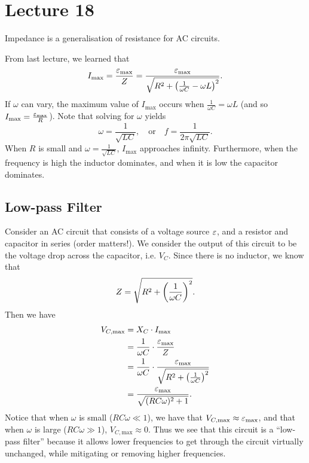 \documentclass[class=article, crop=false]{standalone}
\begin{document}
  \section{Lecture 18}
  \begin{note}{}
    Impedance is a generalisation of resistance for AC circuits.
  \end{note}
  From last lecture, we learned that
  \[
    I_\text{max} = \frac{\varepsilon_\text{max}}{Z} = \frac{\varepsilon_\text{max}}{\sqrt{R^2 + \left( \frac{1}{\omega C} - \omega L \right)^2}}.
  \]
  If $\omega$ can vary, the maximum value of $I_\text{max}$ occurs when $\frac{1}{\omega C} = \omega L$ (and so $I_\text{max} = \frac{\varepsilon_\text{max}}{R}$). Note that solving for $\omega$ yields
  \[
    \omega = \frac{1}{\sqrt{LC}}, \quad\text{or}\quad f = \frac{1}{2\pi\sqrt{LC}}.
  \]
  When $R$ is small and $\omega = \frac{1}{\sqrt{LC}}$, $I_\text{max}$ approaches infinity. Furthermore, when the frequency is high the inductor dominates, and when it is low the capacitor dominates.
  \subsection{Low-pass Filter}
  Consider an AC circuit that consists of a voltage source $\varepsilon$, and a resistor and capacitor in series (order matters!). We consider the output of this circuit to be the voltage drop across the capacitor, i.e. $V_C$. Since there is no inductor, we know that
  \[
    Z = \sqrt{R^2 + \left( \frac{1}{\omega C} \right)^2}.
  \]
  Then we have
  \begin{align*}
    V_{C,\text{max}} &= X_C\cdot I_\text{max} \\
                     &= \frac{1}{\omega C}\cdot \frac{\varepsilon_\text{max}}{Z} \\
                     &= \frac{1}{\omega C}\cdot \frac{\varepsilon_\text{max}}{\sqrt{R^2 + \left( \frac{1}{\omega C} \right)^2}} \\
                     &= \frac{\varepsilon_\text{max}}{\sqrt{(RC\omega)^2 + 1}}.
  \end{align*}
  Notice that when $\omega$ is small ($RC\omega\ll 1$), we have that $V_{C,\text{max}}\approx \varepsilon_\text{max}$, and that when $\omega$ is large ($RC\omega\gg 1$), $V_{C,\text{max}}\approx 0$. Thus we see that this circuit is a ``low-pass filter'' because it allows lower frequencies to get through the circuit virtually unchanged, while mitigating or removing higher frequencies.
\end{document}
